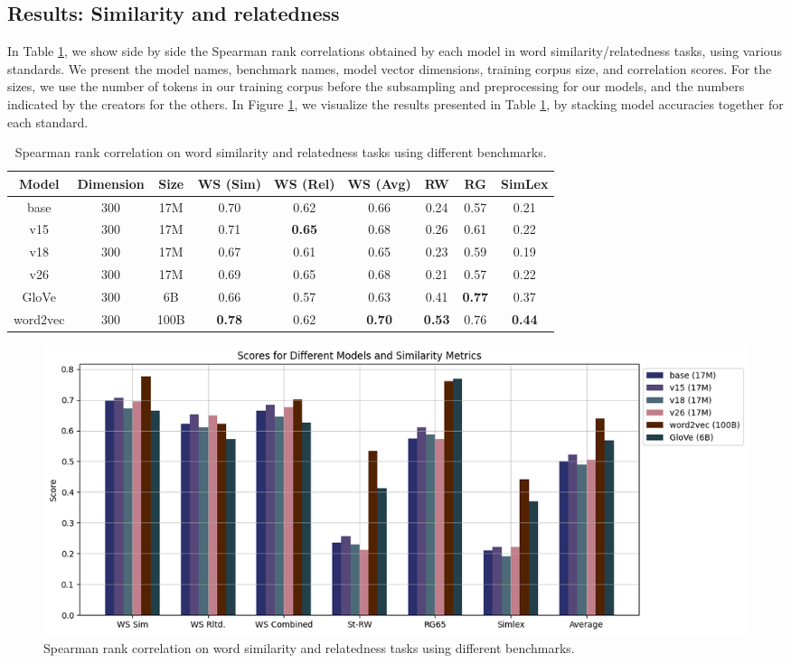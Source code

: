 \subsection{Results: Similarity and relatedness}

In Table \ref{tab:similarity-table}, we show side by side the Spearman rank correlations obtained by each model in word similarity/relatedness tasks, using various standards. We present the model names, benchmark names, model vector dimensions, training corpus size, and correlation scores. For the sizes, we use the number of tokens in our training corpus before the subsampling and preprocessing for our models, and the numbers indicated by the creators for the others. In Figure \ref{fig:similarity-plot}, we visualize the results presented in Table \ref{tab:similarity-table}, by stacking model accuracies together for each standard.

\begin{table}[h]
\centering
\setlength\tabcolsep{3pt} %
\begin{tabular}{|ccc|cccccc|}
\hline
{Model} & {Dimension} & {Size} & {WS (Sim)} & {WS (Rel)} & {WS (Avg)} & {RW} & {RG} & {SimLex} \\ \hline
base & 300 & 17M & 0.70 & 0.62 & 0.66 & 0.24 & 0.57 & 0.21 \\
v15 & 300 & 17M & 0.71 & \textbf{0.65} & 0.68 & 0.26 & 0.61 & 0.22 \\
v18 & 300 & 17M & 0.67 & 0.61 & 0.65 & 0.23 & 0.59 & 0.19 \\
v26 & 300 & 17M & 0.69 & 0.65 & 0.68 & 0.21 & 0.57 & 0.22 \\ \hline
GloVe & 300 & 6B & 0.66 & 0.57 & 0.63 & 0.41 & \textbf{0.77} & 0.37 \\
word2vec & 300 & 100B & \textbf{0.78} & 0.62 & \textbf{0.70} & \textbf{0.53} & 0.76 & \textbf{0.44} \\ \hline
\end{tabular}
\caption{Spearman rank correlation on word similarity and relatedness tasks using different benchmarks.}
\label{tab:similarity-table}
\end{table}

\begin{figure}[h]
    \centering
    \includegraphics[width=1.0\textwidth]{img/sim_plot.png}
    \caption{Spearman rank correlation on word similarity and relatedness tasks using different benchmarks.}
    \label{fig:similarity-plot}
\end{figure}

